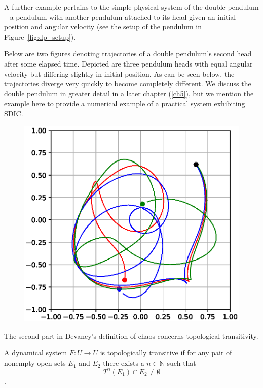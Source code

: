 \begin{Example}\label{ex_DP} \rm
  A further example pertains to the simple physical system of the double pendulum -- a pendulum with another pendulum attached to its head given an initial position and angular velocity (see the setup of the pendulum in Figure~\ref{fig:dp_setup}).  

  Below are two figures denoting trajectories of a double pendulum's second head after some elapsed time. Depicted are three pendulum heads with equal angular velocity but differing slightly in initial position. As can be seen below, the trajectories diverge very quickly to become completely different. We discuss the double pendulum in greater detail in a later chapter (\ref{ch5}), but we mention the example here to provide a numerical example of a practical system exhibiting SDIC.

\begin{figure}[ht]
  \centering
\includegraphics[scale=0.8]{Graphs/_dp_sdic.eps}
    \label{fig:dp_sdic}
  \end{figure}

\end{Example}


The second part in Devaney's definition of chaos concerns topological transitivity.

\begin{Definition}
  \label{Dfn_TopolTrans}\rm
	A dynamical system $F: U \to U$ is topologically transitive if for any pair of nonempty open sets $E_1$ and $E_2$ there exists a $n\in\mathbb{N}$ such that $$T^n(E_1) \cap E_2 \not= \emptyset$$. 
\end{Definition}

